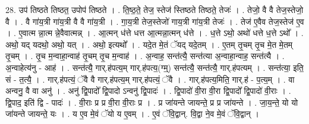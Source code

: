 \documentclass[17pt]{extarticle}
\begin{document}
28. उप॑ तिष्ठते तिष्ठत॒ उपोप॑ तिष्ठते । . ति॒ष्ठ॒ते॒ तेज॒ स्तेज॑ स्तिष्ठते तिष्ठते॒ तेजः॑ । . तेजो॒ वै वै तेज॒स्तेजो॒ वै । . वै गा॑य॒त्री गा॑य॒त्री वै वै गा॑य॒त्री । . गा॒य॒त्री तेज॒स्तेजो॑ गाय॒त्री गा॑य॒त्री तेजः॑ । . तेज॑ ए॒वैव तेज॒स्तेज॑ ए॒व । . ए॒वात्म न्ना॒त्म न्ने॒वैवात्मन्न् । . आ॒त्मन् ध॑त्ते धत्त आ॒त्मन्ना॒त्मन् ध॑त्ते । . ध॒त्ते ऽथो॒ अथो॑ धत्ते ध॒त्ते ऽथो᳚ । . अथो॒ यद् यदथो॒ अथो॒ यत् । . अथो॒ इत्यथो᳚ । . यदे॒त मे॒तं ॅयद् यदे॒तम् । . ए॒तम् तृ॒चम् तृ॒च मे॒त मे॒तम् तृ॒चम् । . तृ॒च म॒न्वाहा॒न्वाह॑ तृ॒चम् तृ॒च म॒न्वाह॑ । . अ॒न्वाह॒ सन्त॑त्यै॒ सन्त॑त्या अ॒न्वाहा॒न्वाह॒ सन्त॑त्यै । . अ॒न्वाहेत्य॑नु - आह॑ । . सन्त॑त्यै॒ गार्.ह॑पत्य॒म् गार्.ह॑पत्य॒(ग्म्॒) सन्त॑त्यै॒ सन्त॑त्यै॒ गार्.ह॑पत्यम् । . सन्त॑त्या॒ इति॒ सं - त॒त्यै॒ । . गार्.ह॑पत्यं॒ ॅवै वै गार्.ह॑पत्य॒म् गार्.ह॑पत्यं॒ ॅवै । . गार्.ह॑पत्य॒मिति॒ गार्.ह॑ - प॒त्य॒म् । . वा अन्वनु॒ वै वा अनु॑ । . अनु॑ द्वि॒पादो᳚ द्वि॒पादो ऽन्वनु॑ द्वि॒पादः॑ । . द्वि॒पादो॑ वी॒रा वी॒रा द्वि॒पादो᳚ द्वि॒पादो॑ वी॒राः । . द्वि॒पाद॒ इति॑ द्वि - पादः॑ । . वी॒राः प्र प्र वी॒रा वी॒राः प्र । . प्र जा॑यन्ते जायन्ते॒ प्र प्र जा॑यन्ते । . जा॒य॒न्ते॒ यो यो जा॑यन्ते जायन्ते॒ यः । . य ए॒व मे॒वं ॅयो य ए॒वम् । . ए॒वं ॅवि॒द्वान्. वि॒द्वा ने॒व मे॒वं ॅवि॒द्वान् । \newline
\end{document}
